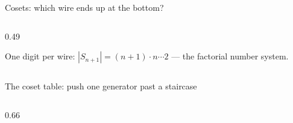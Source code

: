 \begin{frame}{Cosets: which wire ends up at the bottom?}
\begin{columns}[c]
\begin{column}{0.49\textwidth}
\vspace{10pt}
\begin{idea}
\small One digit per wire: $|S_{n+1}| = (n{+}1)\cdot n\cdots 2$ --- the
\alert{factorial number system}.
\end{idea}
\end{column}
\end{columns}
\end{frame}

\begin{frame}{The coset table: push one generator past a staircase}
\begin{columns}[c]
\begin{column}{0.66\textwidth}
\renewcommand{\AgdaCodeStyle}{\footnotesize}
\begin{code}%
\>[0]\AgdaSpace{}%
\AgdaSymbol{:}\AgdaSpace{}%
\AgdaSpace{}%
\AgdaSymbol{(}\AgdaSpace{}%
\AgdaSymbol{)}\AgdaSpace{}%
\AgdaSpace{}%
\AgdaSpace{}%
\AgdaSymbol{(}\AgdaSpace{}%
\AgdaSymbol{)}\AgdaSpace{}%
\AgdaSpace{}%
\AgdaSpace{}%
\AgdaSymbol{(}\AgdaSpace{}%
\AgdaSymbol{)}\AgdaSpace{}%
\AgdaSpace{}%
\AgdaSpace{}%
\AgdaSymbol{(}\AgdaSpace{}%
\AgdaSymbol{)}\<%
\\
\>[0]\AgdaSpace{}%
\AgdaSpace{}%
\AgdaSpace{}%
\AgdaSymbol{=}\AgdaSpace{}%
\AgdaSpace{}%
\AgdaOperator{\AgdaInductiveConstructor{,}}\AgdaSpace{}%
\AgdaSpace{}%
%
\>[36]\<%
\\
\>[0]\AgdaSpace{}%
\AgdaSymbol{(}\AgdaSpace{}%
\AgdaSymbol{)}\AgdaSpace{}%
\AgdaSpace{}%
\AgdaSymbol{=}\AgdaSpace{}%
\AgdaSpace{}%
\AgdaOperator{\AgdaInductiveConstructor{,}}\AgdaSpace{}%
%
\>[36]\<%
\\
\>[0]\AgdaSpace{}%
\AgdaSymbol{(}\AgdaSpace{}%
\AgdaSpace{}%
\AgdaSymbol{)}\AgdaSpace{}%

\end{code}
\end{column}
\end{columns}
\end{frame}
